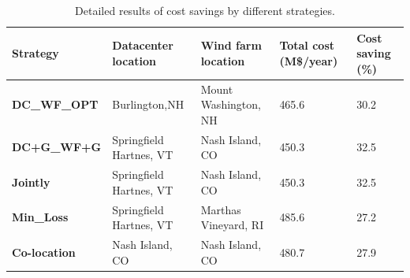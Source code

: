 \begin{table}[ht]
\begin{center}
\caption{Detailed results of cost savings by different strategies.}
\begin{tabular}{|l|p{50pt}|p{50pt}|p{30pt}|p{20pt}|}
\hline
\textbf{Strategy}& \textbf{Datacenter location} &\textbf{Wind farm location} &\textbf{Total cost (M\$/year)} &\textbf{Cost saving (\%)} \\
\hline
\textbf{DC\_WF\_OPT} &  Burlington,NH  & Mount Washington, NH &465.6& 30.2 \\
\textbf{DC+G\_WF+G} &Springfield Hartnes, VT  & Nash Island, CO&450.3& 32.5\\
\textbf{Jointly} &Springfield Hartnes, VT&  Nash Island, CO & 450.3 & 32.5\\
\textbf{Min\_Loss} &Springfield Hartnes, VT & Marthas Vineyard, RI & 485.6& 27.2 \\
\textbf{Co-location}& Nash Island, CO &Nash Island, CO&480.7 & 27.9  \\
\hline
\end{tabular}
\label{tab:costsaving}
\end{center}
\end{table}

